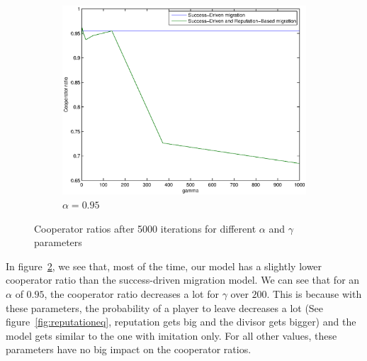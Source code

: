 \documentclass[11pt]{article}
\begin{document}
\begin{figure}[h]
	\begin{subfigure}[t]{0.48\textwidth}
        \includegraphics[width=\textwidth]{../../other/plots/alpha095.eps}
	\caption{$\alpha = 0.95$}
	\label{fig:cooperator_ratios_5000-3}
    	\end{subfigure}

	\caption{Cooperator ratios after 5000 iterations for different $\alpha$ and $\gamma$ parameters}
	\label{fig:cooperator_ratios_5000}
\end{figure}

In figure~\ref{fig:cooperator_ratios_5000}, we see that, most of the time, our model has a slightly lower cooperator ratio than the success-driven migration model.
We can see that for an $\alpha$ of $0.95$, the cooperator ratio decreases a lot for $\gamma$ over $200$. This is because with these parameters, the probability of a player to leave decreases a lot (See figure~\ref{fig:reputationeq}, reputation gets big and the divisor gets bigger) and the model gets similar to the one with imitation only.
For all other values, these parameters have no big impact on the cooperator ratios.
\end{document}
